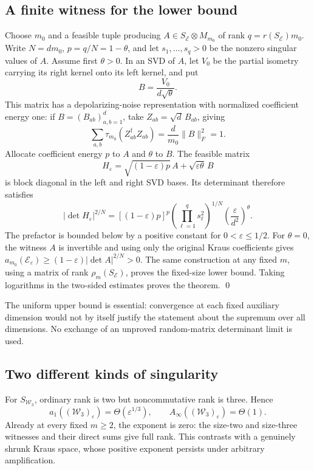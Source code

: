 \documentclass[11pt,a4paper]{article}
\theoremstyle{remark}\newtheorem{remark}[theorem]{Remark}
\newcommand{\E}{\mathcal E}
\newcommand{\W}{\mathcal W}
\newcommand{\M}{M}
\newcommand{\Ainf}{A_\infty}
\begin{document}
\subsection{A finite witness for the lower bound}
Choose \(m_0\) and a feasible tuple producing
\(A\in S_\E\otimes\M_{m_0}\) of rank
\(q=r(S_\E)m_0\).
Write \(N=dm_0\), \(p=q/N=1-\theta\), and let
\(s_1,\ldots,s_q>0\) be the nonzero singular values of \(A\).
Assume first \(\theta>0\).
In an SVD of \(A\), let \(V_0\) be the partial isometry carrying its right kernel onto its left kernel, and put
\[
 B=\frac{V_0}{d\sqrt\theta}.
\]
This matrix has a depolarizing-noise representation with normalized coefficient energy one: if \(B=(B_{ab})_{a,b=1}^d\), take \(Z_{ab}=\sqrt d\,B_{ab}\), giving
\[
 \sum_{a,b}\tau_{m_0}(Z_{ab}^\dagger Z_{ab})
 =\frac d{m_0}\|B\|_F^2=1.
\]
Allocate coefficient energy \(p\) to \(A\) and \(\theta\) to \(B\). The feasible matrix
\[
 H_\varepsilon=\sqrt{(1-\varepsilon)p}\,A
                 +\sqrt{\varepsilon\theta}\,B
\]
is block diagonal in the left and right SVD bases. Its determinant therefore satisfies
\begin{equation}\label{eq:lowerwitness}
 |\det H_\varepsilon|^{2/N}
 = [(1-\varepsilon)p]^p
     \left(\prod_{\ell=1}^q s_\ell^2\right)^{1/N}
     \left(\frac{\varepsilon}{d^2}\right)^\theta .
\end{equation}
The prefactor is bounded below by a positive constant for
\(0<\varepsilon\le1/2\).
For \(\theta=0\), the witness \(A\) is invertible and using only the original Kraus coefficients gives
\(a_{m_0}(\E_\varepsilon)\ge(1-\varepsilon)|\det A|^{2/N}>0\).
The same construction at any fixed \(m\), using a matrix of rank \(\rho_m(S_\E)\), proves the fixed-size lower bound.
Taking logarithms in the two-sided estimates proves the theorem. \qed

The uniform upper bound is essential: convergence at each fixed auxiliary dimension would not by itself justify the statement about the supremum over all dimensions. No exchange of an unproved random-matrix determinant limit is used.

\subsection{Two different kinds of singularity}
For \(S_{\W_3}\), ordinary rank is two but noncommutative rank is three. Hence
\[
 a_1((\W_3)_\varepsilon)=\Theta(\varepsilon^{1/3}),\qquad
 \Ainf((\W_3)_\varepsilon)=\Theta(1).
\]
Already at every fixed \(m\ge2\), the exponent is zero: the size-two and size-three witnesses and their direct sums give full rank.
This contrasts with a genuinely shrunk Kraus space, whose positive exponent persists under arbitrary amplification.
\end{document}

